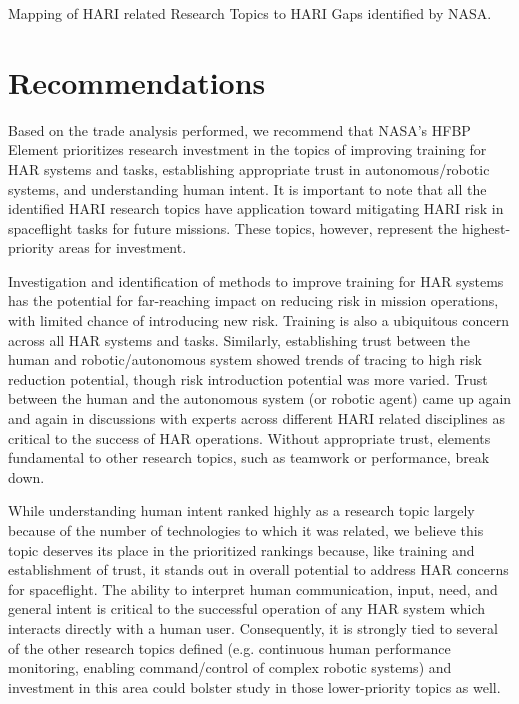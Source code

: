\begin{table}[tb]
    \centering
    \caption[Mapping of HARI related Research Topics to HARI Gaps identified by NASA]{Mapping of HARI related Research Topics to HARI Gaps identified by NASA.}
    \label{table:hari-gaps}
\end{table}

\section{Recommendations}
Based on the trade analysis performed, we recommend that NASA's HFBP Element prioritizes research investment in the topics of improving training for HAR systems and tasks, establishing appropriate trust in autonomous/robotic systems, and understanding human intent.
It is important to note that all the identified HARI research topics have application toward mitigating HARI risk in spaceflight tasks for future missions.
These topics, however, represent the highest-priority areas for investment.

Investigation and identification of methods to improve training for HAR systems has the potential for far-reaching impact on reducing risk in mission operations, with limited chance of introducing new risk.
Training is also a ubiquitous concern across all HAR systems and tasks.
Similarly, establishing trust between the human and robotic/autonomous system showed trends of tracing to high risk reduction potential, though risk introduction potential was more varied.
Trust between the human and the autonomous system (or robotic agent) came up again and again in discussions with experts across different HARI related disciplines as critical to the success of HAR operations.
Without appropriate trust, elements fundamental to other research topics, such as teamwork or performance, break down.

While understanding human intent ranked highly as a research topic largely because of the number of technologies to which it was related, we believe this topic deserves its place in the prioritized rankings because, like training and establishment of trust, it stands out in overall potential to address HAR concerns for spaceflight.
The ability to interpret human communication, input, need, and general intent is critical to the successful operation of any HAR system which interacts directly with a human user.
Consequently, it is strongly tied to several of the other research topics defined (e.g. continuous human performance monitoring, enabling command/control of complex robotic systems) and investment in this area could bolster study in those lower-priority topics as well.

